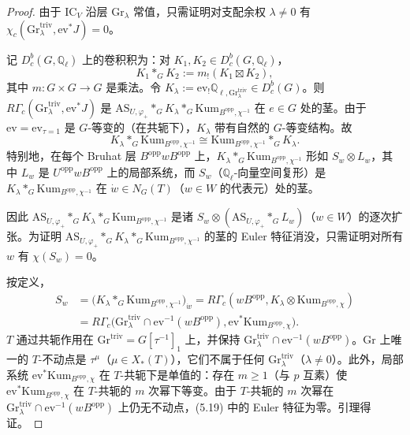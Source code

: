 \begin{proof}
由于 $\mathrm{IC}_V$ 沿层 $\mathrm{Gr}_\lambda$ 常值，只需证明对支配余权 $\lambda\neq 0$ 有 $\chi_c(\mathrm{Gr}^{\mathrm{triv}}_\lambda,\mathrm{ev}^*J)=0$。

记 $D^b_c(G,\mathbb{Q}_\ell)$ 上的卷积积为：对 $K_1,K_2\in D^b_c(G,\mathbb{Q}_\ell)$，
\[
K_1*_G K_2:=m_!(K_1\boxtimes K_2),
\]
其中 $m:G\times G\to G$ 是乘法。令 $K_\lambda:=\mathrm{ev}_!\mathbb{Q}_{\ell,\mathrm{Gr}^{\mathrm{triv}}_\lambda}\in D^b_c(G)$。则 $R\Gamma_c(\mathrm{Gr}^{\mathrm{triv}}_\lambda,\mathrm{ev}^*J)$ 是 $\mathrm{AS}_{U,\varphi_+}*_G K_\lambda*_G\mathrm{Kum}_{B^{\mathrm{opp}},\chi^{-1}}$ 在 $e\in G$ 处的茎。由于 $\mathrm{ev}=\mathrm{ev}_{\tau=1}$ 是 $G$-等变的（在共轭下），$K_\lambda$ 带有自然的 $G$-等变结构。故
\[
K_\lambda*_G\mathrm{Kum}_{B^{\mathrm{opp}},\chi^{-1}}\cong\mathrm{Kum}_{B^{\mathrm{opp}},\chi^{-1}}*_G K_\lambda.
\]
特别地，在每个 Bruhat 层 $B^{\mathrm{opp}}wB^{\mathrm{opp}}$ 上，$K_\lambda*_G\mathrm{Kum}_{B^{\mathrm{opp}},\chi^{-1}}$ 形如 $S_w\otimes L_w$，其中 $L_w$ 是 $U^{\mathrm{opp}}wB^{\mathrm{opp}}$ 上的局部系统，而 $S_w$（$\mathbb{Q}_\ell$-向量空间复形）是 $K_\lambda*_G\mathrm{Kum}_{B^{\mathrm{opp}},\chi^{-1}}$ 在 $\dot w\in N_G(T)$（$w\in W$ 的代表元）处的茎。

因此 $\mathrm{AS}_{U,\varphi_+}*_G K_\lambda*_G\mathrm{Kum}_{B^{\mathrm{opp}},\chi^{-1}}$ 是诸 $S_w\otimes(\mathrm{AS}_{U,\varphi_+}*_G L_w)$（$w\in W$）的逐次扩张。为证明 $\mathrm{AS}_{U,\varphi_+}*_G K_\lambda*_G\mathrm{Kum}_{B^{\mathrm{opp}},\chi^{-1}}$ 的茎的 Euler 特征消没，只需证明对所有 $w$ 有 $\chi(S_w)=0$。

按定义，
\begin{equation}
\begin{split}
S_w&=\big(K_\lambda*_G\mathrm{Kum}_{B^{\mathrm{opp}},\chi^{-1}}\big)_{\dot w}=R\Gamma_c(wB^{\mathrm{opp}},K_\lambda\otimes\mathrm{Kum}_{B^{\mathrm{opp}},\chi})\\
&=R\Gamma_c\big(\mathrm{Gr}^{\mathrm{triv}}_\lambda\cap\mathrm{ev}^{-1}(wB^{\mathrm{opp}}),\mathrm{ev}^*\mathrm{Kum}_{B^{\mathrm{opp}},\chi}\big).
\end{split}
\end{equation}
$T$ 通过共轭作用在 $\mathrm{Gr}^{\mathrm{triv}}=G[\tau^{-1}]_1$ 上，并保持 $\mathrm{Gr}^{\mathrm{triv}}_\lambda\cap\mathrm{ev}^{-1}(wB^{\mathrm{opp}})$。$\mathrm{Gr}$ 上唯一的 $T$-不动点是 $\tau^\mu$（$\mu\in X_*(T)$），它们不属于任何 $\mathrm{Gr}^{\mathrm{triv}}_\lambda$（$\lambda\neq 0$）。此外，局部系统 $\mathrm{ev}^*\mathrm{Kum}_{B^{\mathrm{opp}},\chi}$ 在 $T$-共轭下是单值的：存在 $m\ge 1$（与 $p$ 互素）使 $\mathrm{ev}^*\mathrm{Kum}_{B^{\mathrm{opp}},\chi}$ 在 $T$-共轭的 $m$ 次幂下等变。由于 $T$-共轭的 $m$ 次幂在 $\mathrm{Gr}^{\mathrm{triv}}_\lambda\cap\mathrm{ev}^{-1}(wB^{\mathrm{opp}})$ 上仍无不动点，(5.19) 中的 Euler 特征为零。引理得证。
\end{proof}

